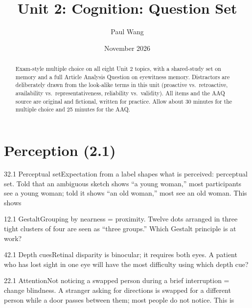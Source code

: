 \documentclass[11pt]{article}
\title{Unit 2: Cognition: Question Set}
\author{Paul Wang}
\date{November 2026}
\begin{document}
\maketitle

\begin{abstract}
Exam-style multiple choice on all eight Unit 2 topics, with a shared-study set on memory and a full Article Analysis Question on eyewitness memory. Distractors are deliberately drawn from the look-alike terms in this unit (proactive vs.\ retroactive, availability vs.\ representativeness, reliability vs.\ validity). All items and the AAQ source are original and fictional, written for practice. Allow about 30 minutes for the multiple choice and 25 minutes for the AAQ.
\end{abstract}


\section{Perception (2.1)}

\begin{q}{3}{2.1 Perceptual set}{Expectation from a label shapes what is perceived: perceptual set.}
Told that an ambiguous sketch shows ``a young woman,'' most participants see a young woman; told it shows ``an old woman,'' most see an old woman. This shows
\end{q}

\begin{q}{1}{2.1 Gestalt}{Grouping by nearness = proximity.}
Twelve dots arranged in three tight clusters of four are seen as ``three groups.'' Which Gestalt principle is at work?
\end{q}

\begin{q}{4}{2.1 Depth cues}{Retinal disparity is binocular; it requires both eyes.}
A patient who has lost sight in one eye will have the most difficulty using which depth cue?
\end{q}

\begin{q}{2}{2.1 Attention}{Not noticing a swapped person during a brief interruption = change blindness.}
A stranger asking for directions is swapped for a different person while a door passes between them; most people do not notice. This is
\end{q}
\end{document}

